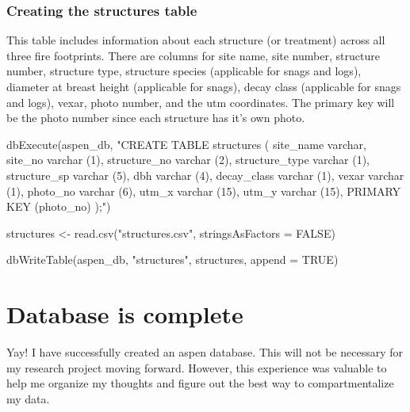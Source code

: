 \documentclass[
]{book}
\newenvironment{Shaded}{\begin{snugshade}}{\end{snugshade}}
\newcommand{\AttributeTok}[1]{\textcolor[rgb]{0.77,0.63,0.00}{#1}}
\newcommand{\ConstantTok}[1]{\textcolor[rgb]{0.00,0.00,0.00}{#1}}
\newcommand{\FunctionTok}[1]{\textcolor[rgb]{0.00,0.00,0.00}{#1}}
\newcommand{\NormalTok}[1]{#1}
\newcommand{\OtherTok}[1]{\textcolor[rgb]{0.56,0.35,0.01}{#1}}
\newcommand{\StringTok}[1]{\textcolor[rgb]{0.31,0.60,0.02}{#1}}
\begin{document}
\hypertarget{creating-the-structures-table}{%
\subsection{Creating the structures table}\label{creating-the-structures-table}}

This table includes information about each structure (or treatment) across all three fire footprints. There are columns for site name, site number, structure number, structure type, structure species (applicable for snags and logs), diameter at breast height (applicable for snags), decay class (applicable for snags and logs), vexar, photo number, and the utm coordinates. The primary key will be the photo number since each structure has it's own photo.

\begin{Shaded}
\begin{Highlighting}[]
\FunctionTok{dbExecute}\NormalTok{(aspen\_db, }\StringTok{"CREATE TABLE structures (}
\StringTok{site\_name varchar, }
\StringTok{site\_no varchar (1), }
\StringTok{structure\_no varchar (2),}
\StringTok{structure\_type varchar (1),}
\StringTok{structure\_sp varchar (5), }
\StringTok{dbh varchar (4), }
\StringTok{decay\_class varchar (1), }
\StringTok{vexar varchar (1),}
\StringTok{photo\_no varchar (6), }
\StringTok{utm\_x varchar (15), }
\StringTok{utm\_y varchar (15),}
\StringTok{PRIMARY KEY (photo\_no)}
\StringTok{);"}\NormalTok{)}

\NormalTok{structures }\OtherTok{\textless{}{-}} \FunctionTok{read.csv}\NormalTok{(}\StringTok{"structures.csv"}\NormalTok{, }\AttributeTok{stringsAsFactors =} \ConstantTok{FALSE}\NormalTok{)}

\FunctionTok{dbWriteTable}\NormalTok{(aspen\_db, }\StringTok{"structures"}\NormalTok{, structures, }\AttributeTok{append =} \ConstantTok{TRUE}\NormalTok{)}
\end{Highlighting}
\end{Shaded}

\hypertarget{database-is-complete}{%
\chapter{Database is complete}\label{database-is-complete}}

Yay! I have successfully created an aspen database. This will not be necessary for my research project moving forward. However, this experience was valuable to help me organize my thoughts and figure out the best way to compartmentalize my data.
\end{document}
